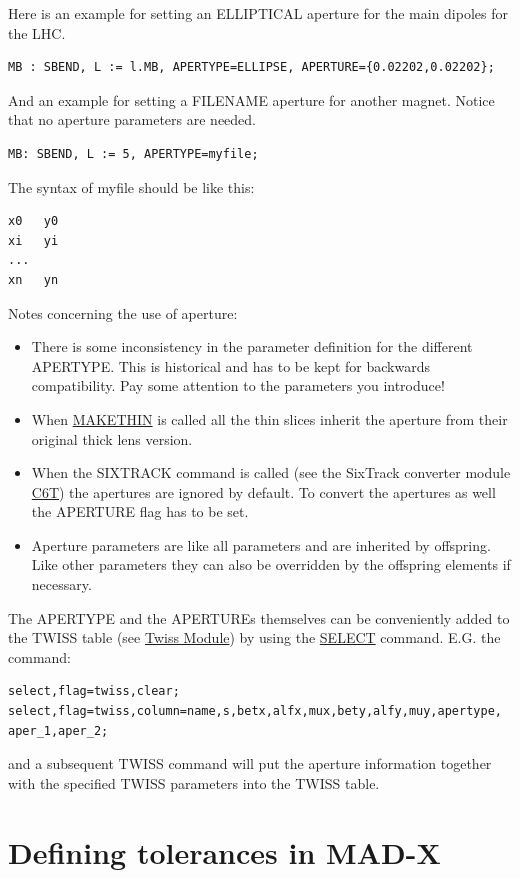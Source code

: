 Here is an example for setting an ELLIPTICAL aperture for the main dipoles for the LHC. 
\begin{verbatim}
MB : SBEND, L := l.MB, APERTYPE=ELLIPSE, APERTURE={0.02202,0.02202};
\end{verbatim} 

And an example for setting a FILENAME aperture for another magnet. Notice that no aperture parameters are needed. 
\begin{verbatim}
MB: SBEND, L := 5, APERTYPE=myfile;
\end{verbatim} 

The syntax of myfile should be like this: 
\begin{verbatim}
x0   y0
xi   yi
...
xn   yn
\end{verbatim}

Notes concerning the use of aperture: 
\begin{itemize}
	\item There is some inconsistency in the parameter definition for the different APERTYPE. This is historical and has to be kept for backwards compatibility. Pay some attention to the parameters you introduce!
	\item When \href{../makethin/makethin.html}{MAKETHIN} is called all the  thin slices inherit the aperture from their original thick lens version. 
	\item When the SIXTRACK command is called (see the SixTrack converter module \href{../c6t/c6t.html}{C6T}) the apertures are ignored by default. To convert the apertures as well the APERTURE flag has to be set. 
	\item  Aperture parameters are like all parameters and are inherited by offspring. Like other parameters they can also be overridden by the offspring elements if necessary. 
\end{itemize}

The APERTYPE and the APERTUREs themselves can be conveniently added to the TWISS table (see \href{../twiss/twiss.html}{Twiss Module}) by using the \href{select.html}{SELECT} command. E.G. the command:  
\begin{verbatim}
select,flag=twiss,clear;
select,flag=twiss,column=name,s,betx,alfx,mux,bety,alfy,muy,apertype,
aper_1,aper_2;
\end{verbatim}

and a subsequent TWISS command will put the aperture information together with the specified TWISS parameters into the TWISS table.  

\section{Defining tolerances in MAD-X}


